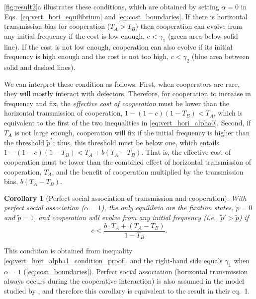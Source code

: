 \documentclass[12pt]{extarticle}
\newtheorem{corollary}{Corollary}
\begin{document}
{\autoref{fig:result2}a illustrates these conditions, which are obtained by setting $\alpha=0$ in Eqs.\ \ref{eq:vert_hori_equilibrium} and \ref{eq:cost_boundaries}. If there is horizontal transmission bias for cooperation ($T_A>T_B$) then cooperation can evolve from any initial frequency if the cost is low enough, $c<\gamma_1$ (green area below solid line). If the cost is not low enough, cooperation can also evolve if its initial frequency is high enough and the cost is not too high, $c<\gamma_2$ (blue area between solid and dashed lines). 

We can interpret these condition as follows. First, when cooperators are rare, they will mostly interact with defectors. Therefore, for cooperation to increase in frequency and fix, the \emph{effective cost of cooperation} must be lower than the horizontal transmission of cooperation, $1-(1-c)(1-T_B) < T_A$, which is equivalent to the first of the two inequalities in \autoref{eq:vert_hori_alpha0}.
Second, if $T_A$ is not large enough, cooperation will fix if the initial frequency is higher than the threshold $\tilde{p}^*$; thus, this threshold must be below one, which entails $1-(1-c)(1-T_B) < T_A + b(T_A-T_B)$. That is, the effective cost of cooperation must be lower than the combined effect of horizontal transmission of cooperation, $T_A$, and the benefit of cooperation multiplied by the transmission bias, $b(T_A-T_B)$. 
\\


\begin{corollary}[Perfect social association of transmission and cooperation]
\label{corollary:alpha1}
With perfect social association ($\alpha=1$), the only equilibria are the fixation states, $\tilde{p}=0$ and $\tilde{p}=1$, and cooperation will evolve from any initial frequency (i.e., $\tilde{p}'>\tilde{p}$) if
\begin{equation}\label{eq:vert_hori_alpha1}
c < \frac{b \cdot T_A + (T_A - T_B)}{1-T_B}.
\end{equation}
\end{corollary}
This condition is obtained from inequality \ref{eq:vert_hori_alpha1_condition_proof}, and the right-hand side equals $\gamma_1$ when $\alpha=1$ (\autoref{eq:cost_boundaries}).
Perfect social association (horizontal transmission always occurs during the cooperative interaction) is also assumed in the model studied by \citet{lewin2017microbes}, and therefore this corollary is equivalent to the result in their eq.~1.

}
\end{document}
